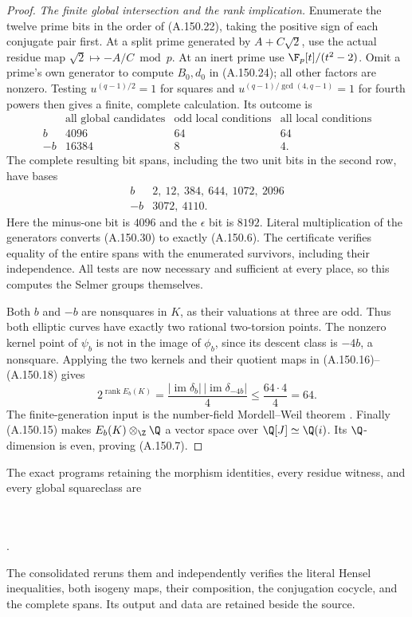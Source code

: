 \begin{proof}
\emph{The finite global intersection and the rank implication.}
Enumerate the twelve prime bits in the order of
(A.150.22), taking the positive sign of each
conjugate pair first.
At a split prime generated by \(A+C\sqrt2\),
use the actual residue map
\(\sqrt2\mapsto-A/C\bmod p\).
At an inert prime use
\(\F_p[t]/(t^2-2)\).
Omit a prime's own generator to compute \(B_0,d_0\)
in (A.150.24); all other factors are nonzero.
Testing \(u^{(q-1)/2}=1\) for squares and
\(u^{(q-1)/\gcd(4,q-1)}=1\) for fourth powers
then gives a finite, complete calculation.
Its outcome is
\[
 \begin{array}{c|r|r|r}
 &\text{all global candidates}&\text{odd local conditions}
                                      &\text{all local conditions}\\ \hline
 b&4096&64&64\\
 -b&16384&8&4 .
 \end{array}
\tag{A.150.29}
\]
The complete resulting bit spans, including the two
unit bits in the second row, have bases
\[
 \begin{array}{c|l}
 b&2,\ 12,\ 384,\ 644,\ 1072,\ 2096\\
 -b&3072,\ 4110 .
 \end{array}
\tag{A.150.30}
\]
Here the minus-one bit is \(4096\) and the
\(\epsilon\) bit is \(8192\).
Literal multiplication of the generators converts
(A.150.30) to exactly (A.150.6).
The certificate verifies equality of the entire
spans with the enumerated survivors, including
their independence.  All tests are now necessary
and sufficient at every place, so this computes
the Selmer groups themselves.

Both \(b\) and \(-b\) are nonsquares in \(K\),
as their valuations at three are odd.
Thus both elliptic curves have exactly two
rational two-torsion points.
The nonzero kernel point of \(\psi_b\) is not in
the image of \(\phi_b\), since its descent class
is \(-4b\), a nonsquare.
Applying the two kernels and their quotient maps
in (A.150.16)--(A.150.18) gives
\[
 2^{\operatorname{rank}E_b(K)}
       =\frac{|\operatorname{im}\delta_b|\,
                   |\operatorname{im}\delta_{-4b}|}{4}
       \le\frac{64\cdot4}{4}=64 .
\tag{A.150.31}
\]
The finite-generation input is the number-field
Mordell--Weil theorem
\cite[Chapter IV, unnumbered finite basis theorem,
printed p.~105, and \S4]{AgentMilneEC2021}.
Finally (A.150.15) makes
\(E_b(K)\otimes_\Z\Q\) a vector space over
\(\Q[J]\simeq\Q(i)\).  Its \(\Q\)-dimension is even,
proving (A.150.7).
\end{proof}

The exact programs retaining the morphism identities,
every residue witness, and every global squareclass are
\begin{flushleft}
\\
\\
.
\end{flushleft}
The consolidated
reruns them and independently verifies the literal
Hensel inequalities, both isogeny maps, their composition,
the conjugation cocycle, and the complete spans.
Its output and data are retained beside the source.
